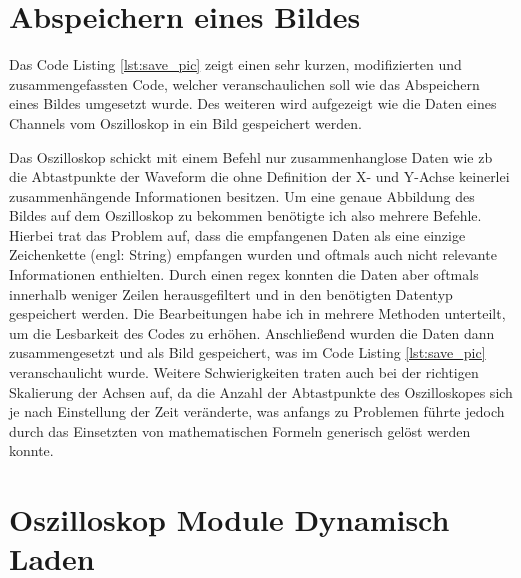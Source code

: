 \section{Abspeichern eines Bildes}
\label{sec:save_pic}

Das Code Listing \ref{lst:save_pic} zeigt einen sehr kurzen, modifizierten und zusammengefassten Code, welcher veranschaulichen soll wie das Abspeichern eines Bildes umgesetzt wurde. Des weiteren wird aufgezeigt wie die Daten eines Channels vom Oszilloskop in ein Bild gespeichert werden.


Das Oszilloskop schickt mit einem Befehl nur zusammenhanglose Daten wie \ac{zb} die Abtastpunkte der Waveform die ohne Definition der X- und Y-Achse keinerlei zusammenhängende Informationen besitzen. Um eine genaue Abbildung des Bildes auf dem Oszilloskop zu bekommen benötigte ich also mehrere Befehle. Hierbei trat das Problem auf, dass die empfangenen Daten als eine einzige Zeichenkette (engl: String) empfangen wurden und oftmals auch nicht relevante Informationen enthielten. Durch einen \ac{regex} konnten die Daten aber oftmals innerhalb weniger Zeilen herausgefiltert und in den benötigten Datentyp gespeichert werden. Die Bearbeitungen habe ich in mehrere Methoden unterteilt, um die Lesbarkeit des Codes zu erhöhen. Anschließend wurden die Daten dann zusammengesetzt und als Bild gespeichert, was im Code Listing \ref{lst:save_pic} veranschaulicht wurde. Weitere Schwierigkeiten traten auch bei der richtigen Skalierung der Achsen auf, da die Anzahl der Abtastpunkte des Oszilloskopes sich je nach Einstellung der Zeit veränderte, was anfangs zu Problemen führte jedoch durch das Einsetzten von mathematischen Formeln generisch gelöst werden konnte. 

\section{Oszilloskop Module Dynamisch Laden}
\label{sec:dynamic_load}

